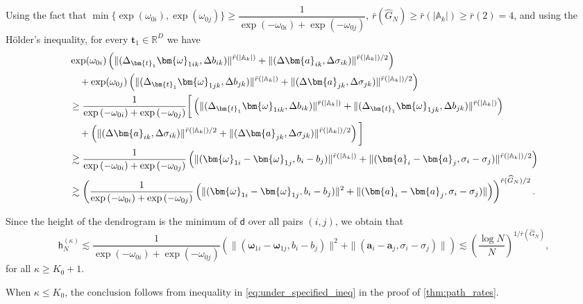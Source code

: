 \documentclass[twoside]{article}
\newcommand{\divclus}{\mathsf{d}}
\newcommand{\height}{\mathsf{h}}
\theoremstyle{plain}
\theoremstyle{definition}
\theoremstyle{plain}
\def\vomega{{\bm{\omega}}}
\def\va{{\bm{a}}}
\def\vt{{\bm{t}}}
\def\sA{{\mathbb{A}}}
\begin{document}
    Using the fact that $\min \{ \exp{(\omega_{0i})}, \exp{(\omega_{0j})} \} \geq \dfrac{1}{\exp{( -\omega_{0i})} + \exp{(-\omega_{0j})}}$, $\bar{r} (\widehat{G}_N) \geq \bar{r} (|\sA_k|) \geq \bar{r} (2) = 4$, and using the H\"older's inequality, for every $\vt_1 \in \mathbb{R}^D$ we have 
    \begin{align*}
        &\exp(\omega_{0i}) \left( \|(\Delta_{\vt_{1}} \vomega_{1 i k},  \Delta b_{i k})\|^{\bar{r}(|\sA_k|)} + \|(\Delta \va_{i k},\Delta \sigma_{i k})\|^{\bar{r}(|\sA_k|)/2} \right)  \\ %
        &\hspace{1 em}+  \exp(\omega_{0j}) \left( \|(\Delta_{\vt_{1}} \vomega_{1 j k},  \Delta b_{j k})\|^{\bar{r}(|\sA_k|)} + \|(\Delta \va_{j k},\Delta \sigma_{j k})\|^{\bar{r}(|\sA_k|)/2} \right) \\
        &\geq \dfrac{1}{\exp{( -\omega_{0i})} + \exp{(-\omega_{0j})}} \bigg[ \left(\|(\Delta_{\vt_{1}} \vomega_{1 i k},  \Delta b_{i k})\|^{\bar{r}(|\sA_k|)} + \|(\Delta_{\vt_{1}} \vomega_{1 j k},  \Delta b_{j k})\|^{\bar{r}(|\sA_k|)} \right)  \\
        &\hspace{1 em}+ \left( \|(\Delta \va_{i k},\Delta \sigma_{i k})\|^{\bar{r}(|\sA_k|)/2} + \|(\Delta \va_{j k},\Delta \sigma_{j k})\|^{\bar{r}(|\sA_k|)/2} \right) \bigg] \\
        &\gtrsim \dfrac{1}{\exp{( -\omega_{0i})} + \exp{(-\omega_{0j})}} \left( \|   (\vomega_{1i} - \vomega_{1j},   b_{i} - b_j)\|^{\bar{r}(|\sA_k|)} + \|( \va_{i} - \va_j, \sigma_{i} - \sigma_j)\|^{\bar{r}(|\sA_k|)/2} \right) \\
        &\gtrsim \left( \dfrac{1}{\exp{( -\omega_{0i})} + \exp{(-\omega_{0j})}} \left( \| (\vomega_{1i} - \vomega_{1j},   b_{i} - b_j)\|^{2} + \|( \va_{i} - \va_j, \sigma_{i} - \sigma_j)\| \right) \right)^{\bar{r}(\widehat{G}_N)/2}.
    \end{align*}

    Since the height of the dendrogram is the minimum of $\divclus$ over all pairs $(i, j)$, we obtain that $$\height_N^{(\kappa)} \lesssim \dfrac{1}{\exp{( -\omega_{0i})} + \exp{(-\omega_{0j})}} \left( \| (\vomega_{1i} - \vomega_{1j},   b_{i} - b_j)\|^{2} + \|( \va_{i} - \va_j, \sigma_{i} - \sigma_j)\| \right) \lesssim \left( \frac{\log N}{N} \right)^{1/\bar{r}(\widehat{G}_N)},$$ for all $\kappa \geq K_0 +1$.

    When $\kappa \leq K_0$, the conclusion follows from inequality in \cref{eq:under_specified_ineq} in the proof of \cref{thm:path_rates}.
\end{document}
